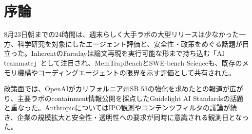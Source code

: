 \section*{序論}
8月23日朝までの24時間は、週末らしく大手ラボの大型リリースは少なかった一方、科学研究を対象にしたエージェント評価と、安全性・政策をめぐる話題が目立った。InherentのFaradayは論文再現を実行可能な形まで持ち込む「AI teammate」として注目され、MemTrapBenchとSWE-bench Scienceも、既存のメモリ機構やコーディングエージェントの限界を示す評価として共有された。

政策面では、OpenAIがカリフォルニア州SB 53の強化を求めたとの報道が広がり、主要ラボのcontainment情報公開を採点したGuidelight AI Standardsの話題と重なった。AnthropicについてはIPO観測やコンテンツフィルタの議論が続き、企業の規模拡大と安全性・透明性への要求が同時に意識される観測日となった。
